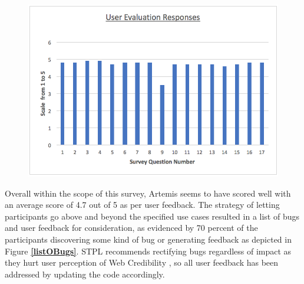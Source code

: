     \begin{figure}[h]
    	\includegraphics[scale=0.66,center]{chapters/chapter04/figures/userEvaluationGraph.png}
    	\label{graph}
    \end{figure}
    
    
    
    Overall within the scope of this survey, Artemis seems to have scored well with an average score of 4.7 out of 5 as per user feedback. The strategy of letting participants go above and beyond the specified use cases resulted in a list of bugs and user feedback for consideration, as evidenced by 70 percent of the participants discovering some kind of bug or generating feedback as depicted in Figure \textbf{\ref{listOBugs}}. STPL recommends rectifying bugs regardless of impact as they hurt user perception of Web Credibility \cite{Fogg2002}, so all user feedback has been addressed by updating the code accordingly.
    
